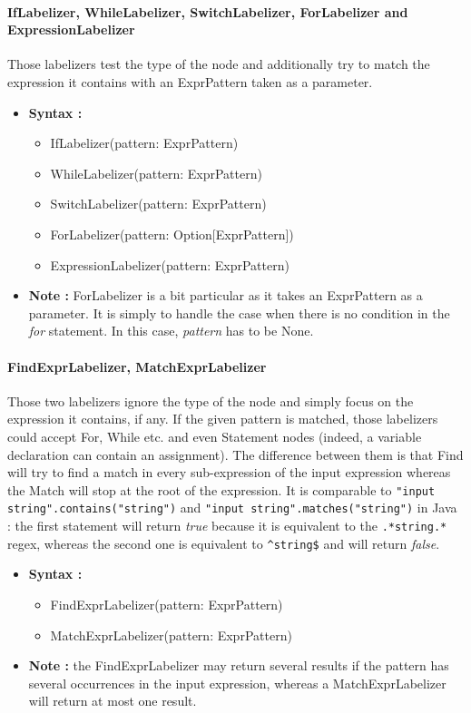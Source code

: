 \documentclass{report}
\begin{document}
\paragraph{IfLabelizer, WhileLabelizer, SwitchLabelizer, ForLabelizer and ExpressionLabelizer}
Those labelizers test the type of the node and additionally try to match the expression it contains with 
an ExprPattern taken as a parameter.
\begin{itemize}
	\item{\textbf{Syntax :}}
	\begin{itemize}
		 \item IfLabelizer(pattern: ExprPattern)
		 \item WhileLabelizer(pattern: ExprPattern)
		 \item SwitchLabelizer(pattern: ExprPattern)
		 \item ForLabelizer(pattern: Option[ExprPattern])
		 \item ExpressionLabelizer(pattern: ExprPattern)
	\end{itemize}
	\item{\textbf{Note :}} ForLabelizer is a bit particular as it takes an ExprPattern as a parameter. It is simply to handle the case when there is no condition
			 in the \textit{for} statement. In this case, \textit{pattern} has to be None.
\end{itemize}

\paragraph{FindExprLabelizer, MatchExprLabelizer}
Those two labelizers ignore the type of the node and simply focus on the expression it contains, if any.
If the given pattern is matched, those labelizers could accept For, While etc. and even Statement nodes (indeed, a variable declaration can contain an assignment).
The difference between them is that Find will try to find a match in every sub-expression of the input expression whereas the Match will stop at the root of the expression.
It is comparable to \lstinline|"input string".contains("string")| and \lstinline|"input string".matches("string")| in Java : the first statement will return \textit{true} because it is equivalent to the \lstinline|.*string.*| regex, whereas
the second one is equivalent to \lstinline|^string$| and will return \textit{false}.
\begin{itemize}
	\item{\textbf{Syntax :}}
	\begin{itemize}
		 \item FindExprLabelizer(pattern: ExprPattern)
		 \item MatchExprLabelizer(pattern: ExprPattern)
	\end{itemize}
	\item{\textbf{Note :}} the FindExprLabelizer may return several results if the pattern has several occurrences in the input expression,
					  whereas a MatchExprLabelizer will return at most one result.
\end{itemize}
\end{document}
